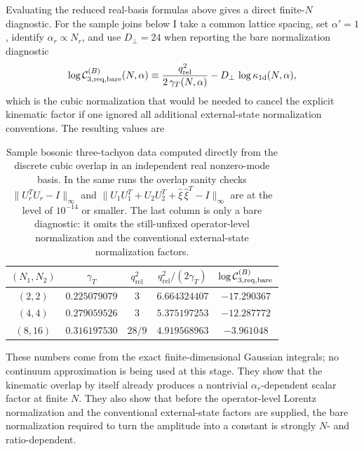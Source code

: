 \documentclass[11pt]{article}
\numberwithin{equation}{section}
\newcommand{\perpD}{D_\perp}
\begin{document}
Evaluating the reduced real-basis formulas above gives a direct finite-$N$ diagnostic. For the sample joins below I take a common lattice spacing, set $\alpha'=1$, identify $\alpha_r\propto N_r$, and use $\perpD=24$ when reporting the bare normalization diagnostic
\begin{equation}
\label{eq:s12-1-025}
\log {\cal C}^{(B)}_{3,\mathrm{req,bare}}(N,\alpha)
\equiv
\frac{q_{\mathrm{rel}}^2}{2\,\gamma_T(N,\alpha)}
-\perpD\,\log \kappa_{1\mathrm d}(N,\alpha),
\end{equation}
which is the cubic normalization that would be needed to cancel the explicit kinematic factor if one ignored all additional external-state normalization conventions. The resulting values are
\begin{table}[t]
\centering
\begin{tabular}{c c c c c}
$(N_1,N_2)$ & $\gamma_T$ & $q_{\mathrm{rel}}^2$ & $q_{\mathrm{rel}}^2/(2\gamma_T)$ & $\log {\cal C}^{(B)}_{3,\mathrm{req,bare}}$ \\
\hline
$(2,2)$ & $0.225079079$ & $3$ & $6.664324407$ & $-17.290367$ \\
$(4,4)$ & $0.279059526$ & $3$ & $5.375197253$ & $-12.287772$ \\
$(8,16)$ & $0.316197530$ & $28/9$ & $4.919568963$ & $-3.961048$
\end{tabular}
\caption{Sample bosonic three-tachyon data computed directly from the discrete cubic overlap in an independent real nonzero-mode basis. In the same runs the overlap sanity checks $\|U_r^TU_r-I\|_\infty$ and $\|U_1U_1^T+U_2U_2^T+\widehat\xi\,\widehat\xi^T-I\|_\infty$ are at the level of $10^{-14}$ or smaller. The last column is only a bare diagnostic: it omits the still-unfixed operator-level normalization and the conventional external-state normalization factors.}
\label{tab:ttt-samples}
\end{table}
These numbers come from the exact finite-dimensional Gaussian integrals; no continuum approximation is being used at this stage. They show that the kinematic overlap by itself already produces a nontrivial $\alpha_r$-dependent scalar factor at finite $N$. They also show that before the operator-level Lorentz normalization and the conventional external-state factors are supplied, the bare normalization required to turn the amplitude into a constant is strongly $N$- and ratio-dependent.
\end{document}
